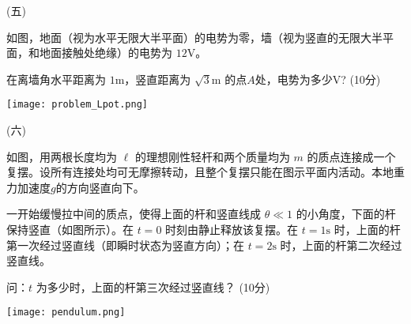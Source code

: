 \documentclass[12pt,CJK]{article}
\def\mark#1{{\color{blue} (#1分)}}
\begin{document}
\item[(五)]{
    如图，地面（视为水平无限大半平面）的电势为零，墙（视为竖直的无限大半平面，和地面接触处绝缘）的电势为 $12\mathrm{V}$。
    
    在离墙角水平距离为 $1\mathrm{m}$，竖直距离为 $\sqrt{3}\mathrm{m}$ 的点$A$处，电势为多少$\mathrm{V}$? \mark{10}

    \texttt{[image: problem\_Lpot.png]}    
    
    \vspace{2in}
    
  }
\item[(六)]{

    如图，用两根长度均为 $\ell$ 的理想刚性轻杆和两个质量均为 $m$ 的质点连接成一个复摆。设所有连接处均可无摩擦转动，且整个复摆只能在图示平面内活动。本地重力加速度$g$的方向竖直向下。
    
    一开始缓慢拉中间的质点，使得上面的杆和竖直线成 $\theta\ll 1$ 的小角度，下面的杆保持竖直（如图所示）。在 $t=0$ 时刻由静止释放该复摆。在 $t=1\mathrm{s}$ 时，上面的杆第一次经过竖直线（即瞬时状态为竖直方向）；在 $t=2\mathrm{s}$ 时，上面的杆第二次经过竖直线。
    
    问：$t$ 为多少时，上面的杆第三次经过竖直线？ \mark{10}    

    \texttt{[image: pendulum.png]}

   
    
  }
\eitem    


\ech
\end{document}

